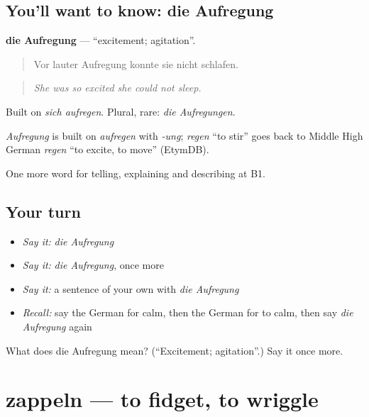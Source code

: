 \subsection*{You'll want to know: die Aufregung}
\textbf{die Aufregung} — \textquotedblleft{}excitement; agitation\textquotedblright{}.

\begin{quote}
Vor lauter Aufregung konnte sie nicht schlafen.
\end{quote}

\begin{quote}
\emph{She was so excited she could not sleep.}
\end{quote}

Built on \emph{sich aufregen}. Plural, rare: \emph{die Aufregungen}.

\begin{cousinweb}
\emph{Aufregung} is built on \emph{aufregen} with \emph{-ung}; \emph{regen} \textquotedblleft{}to stir\textquotedblright{} goes back to Middle High German \emph{regen} \textquotedblleft{}to excite, to move\textquotedblright{} (EtymDB).
\end{cousinweb}

\begin{grammarlens}[title={What you've built}]
One more word for telling, explaining and describing at B1.
\end{grammarlens}

\subsection*{Your turn}
\begin{itemize}
\raggedright
  \item \emph{Say it:} \emph{die Aufregung}
  \item \emph{Say it:} \emph{die Aufregung}, once more
  \item \emph{Say it:} a sentence of your own with \emph{die Aufregung}
  \item \emph{Recall:} say the German for calm, then the German for to calm, then say \emph{die Aufregung} again
\end{itemize}

\begin{tcolorbox}[breakable,colback=teal!4,colframe=teal!35!black,title={Before you move on}]
What does die Aufregung mean? (\textquotedblleft{}Excitement; agitation\textquotedblright{}.) Say it once more.
\end{tcolorbox}
\section[zappeln]{zappeln — to fidget, to wriggle}

